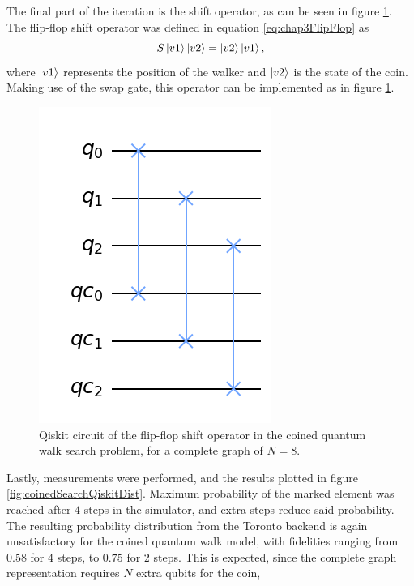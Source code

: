 \documentclass[../../dissertation.tex]{subfiles}
\begin{document}
The final part of the iteration is the shift operator, as can be seen in figure
\ref{fig:coinedQWSearchShiftCircuitQistkit}. The flip-flop shift operator was
defined in equation \ref{eq:chap3FlipFlop} as
\begin{equation}
        S\ket{v1}\ket{v2} = \ket{v2}\ket{v1},
        \label{eq:chap4FlipFlop}
\end{equation}
where $\ket{v1}$ represents the position of the walker and $\ket{v2}$ is the
state of the coin. Making use of the swap gate, this operator can be
implemented as in figure \ref{fig:coinedQWSearchShiftCircuitQistkit}.
\begin{figure}[!h]
	\centering
	\includegraphics[scale=0.27]{img/Qiskit/CoinedQuantumWalk/Search/Circuits/CoinedSearchQiskitCircShift_N3_M4_S5.png}
	\caption{Qiskit circuit of the  flip-flop shift operator in the coined quantum walk search problem, for a complete graph of $N=8$.} 
	\label{fig:coinedQWSearchShiftCircuitQistkit}
\end{figure}\par
Lastly, measurements were performed, and the results plotted in figure
\ref{fig:coinedSearchQiskitDist}. Maximum probability of the marked element was
reached after $4$ steps in the simulator, and extra steps reduce said
probability.  The resulting probability distribution from the Toronto backend
is again unsatisfactory for the coined quantum walk model, with fidelities
ranging from $0.58$ for $4$ steps, to $0.75$ for $2$ steps. This is expected,
since the complete graph representation requires $N$ extra qubits for the coin,
\end{document}
